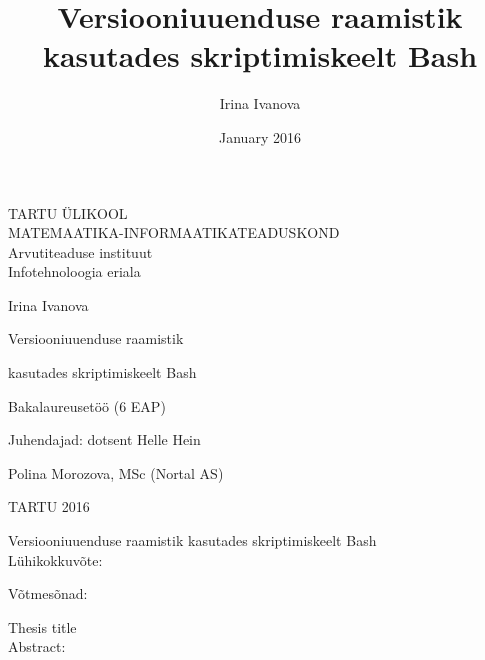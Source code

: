 \documentclass[12pt]{report}
\title{Versiooniuuenduse raamistik kasutades skriptimiskeelt Bash}
\author{Irina Ivanova}
\date{January 2016}
\begin{document}
  \begin{titlepage}
    \begin{center}
      TARTU ÜLIKOOL\\
      MATEMAATIKA-INFORMAATIKATEADUSKOND\\
      Arvutiteaduse instituut\\
      Infotehnoloogia eriala
    \end{center}
      
    \vspace{5cm}
    
    \begin{center}  
      {\Large Irina Ivanova}
    \end{center}
    \begin{center}      
      {\huge Versiooniuuenduse raamistik}
    \end{center}
    \begin{center}
      {\huge kasutades skriptimiskeelt Bash}
    \end{center}
    \begin{center}
      {\large Bakalaureusetöö (6 EAP)}
    \end{center}
      
    \vspace{4cm}
    \hspace{4.5cm}
    Juhendajad: dotsent Helle Hein
    
    \hspace{7cm}
    Polina Morozova, MSc (Nortal AS)
      
    \vspace{2.5cm}
    \begin{center}
      TARTU 2016
    \end{center}
  \end{titlepage}

  \newpage
  
  Versiooniuuenduse raamistik kasutades skriptimiskeelt Bash\\
  
  Lühikokkuvõte:\\
  \vspace{2cm}

  Võtmesõnad:\\
  \vspace{2cm}

  Thesis title\\

  Abstract:\\
  \vspace{2cm}
\end{document}
